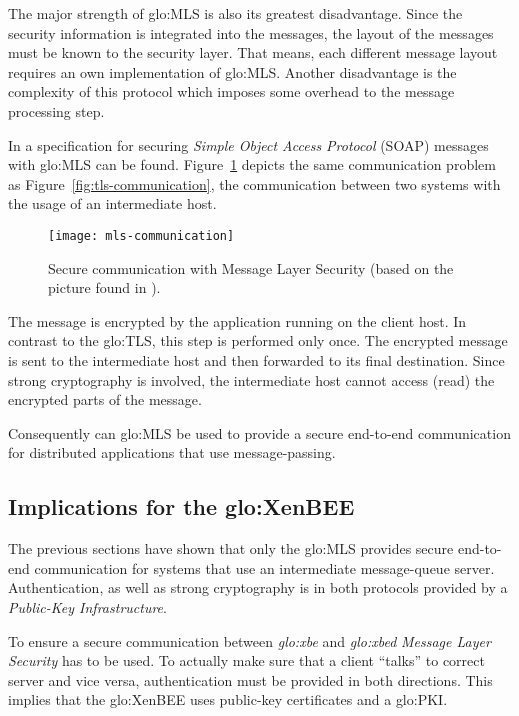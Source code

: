 The  major strength of  \gls{glo:MLS} is  also its  greatest disadvantage.
Since the security information is integrated into the messages, the layout
of the  messages must  be known  to the security  layer. That  means, each
different message layout requires  an own implementation of \gls{glo:MLS}.
Another disadvantage is the complexity of this protocol which imposes some
overhead to the message processing step.

In  \cite{oasis-wss}  a  specification  for securing  \emph{Simple  Object
  Access  Protocol}  (SOAP)  messages  with \gls{glo:MLS}  can  be  found.
Figure~\ref{fig:mls-communication} depicts  the same communication problem
as Figure~\ref{fig:tls-communication},  \ie the communication  between two
systems with the usage of an intermediate host.

\begin{figure}[ht]
  \centering
  \texttt{[image: mls-communication]}
  \caption[Secure   communication  with  MLS]{Secure   communication  with
    Message Layer Security (based on the picture found in \cite{mls}).}
  \label{fig:mls-communication}
\end{figure}

The message is encrypted by the application running on the client host. In
contrast  to the  \gls{glo:TLS}, this  step is  performed only  once.  The
encrypted message is  sent to the intermediate host  and then forwarded to
its  final  destination.   Since  strong  cryptography  is  involved,  the
intermediate  host cannot  access (\ie  read) the  encrypted parts  of the
message.

Consequently  can \gls{glo:MLS}  be used  to provide  a  secure end-to-end
communication for distributed applications that use message-passing.


\subsection{Implications for the \gls{glo:XenBEE}}

The  previous sections  have shown  that only  the  \gls{glo:MLS} provides
secure  end-to-end  communication for  systems  that  use an  intermediate
message-queue server.   Authentication, as well as  strong cryptography is
in both protocols provided by a \emph{Public-Key Infrastructure}.

To  ensure   a  secure  communication   between  \emph{\gls{glo:xbe}}  and
\emph{\gls{glo:xbed}}  \emph{Message Layer  Security} has  to be  used. To
actually  make sure that  a client  ``talks'' to  correct server  and vice
versa, authentication  must be provided  in both directions.  This implies
that   the   \gls{glo:XenBEE}   uses   public-key   certificates   and   a
\gls{glo:PKI}.




